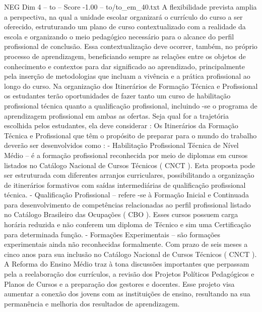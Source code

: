 \begin{textsample}{NEG Dim 4 – to – Score -1.00 – to/to\_em\_40.txt}
A flexibilidade prevista amplia a perspectiva, na qual a unidade escolar organizará o currículo do curso a ser oferecido, estruturando um plano de curso contextualizado com a realidade da escola e organizando o meio pedagógico necessário para o alcance do perfil profissional de conclusão.
Essa contextualização deve ocorrer, também, no próprio processo de aprendizagem, beneficiando sempre as relações entre os objetos de conhecimento e contextos para dar significado ao aprendizado, principalmente pela inserção de metodologias que incluam a vivência e a prática profissional ao longo do curso.
Na organização dos Itinerários de Formação Técnica e Profissional os estudantes terão oportunidades de fazer tanto um curso de habilitação profissional técnica quanto a qualificação profissional, incluindo -se o programa de aprendizagem profissional em ambas as ofertas.
Seja qual for a trajetória escolhida pelos estudantes, ela deve considerar : Os Itinerários da Formação Técnica e Profissional que têm o propósito de preparar para o mundo do trabalho deverão ser desenvolvidos como : - Habilitação Profissional Técnica de Nível Médio – é a formação profissional reconhecida por meio de diplomas em cursos listados no Catálogo Nacional de Cursos Técnicos ( CNCT ).
Esta proposta pode ser estruturada com diferentes arranjos curriculares, possibilitando a organização de itinerários formativos com saídas intermediárias de qualificação profissional técnica. - Qualificação Profissional – refere -se à Formação Inicial e Continuada para desenvolvimento de competências relacionadas ao perfil profissional listado no Catálogo Brasileiro das Ocupações ( CBO ).
Esses cursos possuem carga horária reduzida e não conferem um diploma de Técnico e sim uma Certificação para determinada função. - Formações Experimentais – são formações experimentais ainda não reconhecidas formalmente.
Com prazo de seis meses a cinco anos para sua inclusão no Catálogo Nacional de Cursos Técnicos ( CNCT ).
A Reforma do Ensino Médio traz à tona discussões importantes que perpassam pela a reelaboração dos currículos, a revisão dos Projetos Políticos Pedagógicos e Planos de Cursos e a preparação dos gestores e docentes.
Esse projeto visa aumentar a conexão dos jovens com as instituições de ensino, resultando na sua permanência e melhoria dos resultados de aprendizagem.

\end{textsample}
